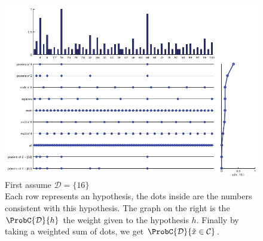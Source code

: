 \begin{figure}[H]
    \begin{center}
        \includegraphics[width=\textwidth]{./chaps/31_sec/images/1_posterior_predictive_dist.png}
    \end{center}
    \caption{First assume $\mathcal{D}=\{16\}$\\ 
        Each row represents an hypothesis, the dots inside are the numbers consistent
        with this hypothesis. The graph on the right is the $\ProbC{\mathcal{D}}{h}$ the 
        weight given to the hypothesis $h$. Finally by taking a weighted sum of dots, 
        we get $\ProbC{\mathcal{D}}{\tilde{x}\in\mathcal{C}}$.}
    \label{fig:1_posterior_predictive_dist}
\end{figure}


